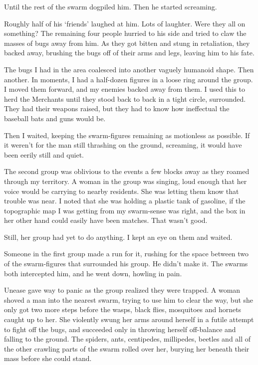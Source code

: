 Until the rest of the swarm dogpiled him.  Then he started screaming.



Roughly half of his `friends' laughed at him.  Lots of laughter.  Were they all on something?  The remaining four people hurried to his side and tried to claw the masses of bugs away from him.  As they got bitten and stung in retaliation, they backed away, brushing the bugs off of their arms and legs, leaving him to his fate.



The bugs I had in the area coalesced into another vaguely humanoid shape.  Then another.  In moments, I had a half-dozen figures in a loose ring around the group.  I moved them forward, and my enemies backed away from them.  I used this to herd the Merchants until they stood back to back in a tight circle, surrounded.  They had their weapons raised, but they had to know how ineffectual the baseball bats and guns would be.



Then I waited, keeping the swarm-figures remaining as motionless as possible.  If it weren't for the man still thrashing on the ground, screaming, it would have been eerily still and quiet.



The second group was oblivious to the events a few blocks away as they roamed through my territory.  A woman in the group was singing, loud enough that her voice would be carrying to nearby residents.  She was letting them know that trouble was near.  I noted that she was holding a plastic tank of gasoline, if the topographic map I was getting from my swarm-sense was right, and the box in her other hand could easily have been matches.  That wasn't good.



Still, her group had yet to do anything.  I kept an eye on them and waited.



Someone in the first group made a run for it, rushing for the space between two of the swarm-figures that surrounded his group.  He didn't make it.  The swarms both intercepted him, and he went down, howling in pain.



Unease gave way to panic as the group realized they were trapped.  A woman shoved a man into the nearest swarm, trying to use him to clear the way, but she only got two more steps before the wasps, black flies, mosquitoes and hornets caught up to her.  She violently swung her arms around herself in a futile attempt to fight off the bugs, and succeeded only in throwing herself off-balance and falling to the ground.  The spiders, ants, centipedes, millipedes, beetles and all of the other crawling parts of the swarm rolled over her, burying her beneath their mass before she could stand.



